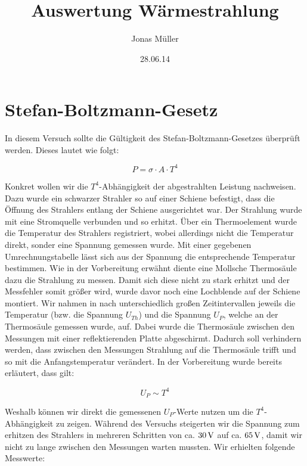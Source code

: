 \documentclass[12pt,twoside,a4paper]{article}
\title{Auswertung Wärmestrahlung}
\author{Jonas Müller}
\date{28.06.14}
\begin{document}
\section{Stefan-Boltzmann-Gesetz}

In diesem Versuch sollte die Gültigkeit des Stefan-Boltzmann-Gesetzes überprüft werden. Dieses lautet wie folgt:

\begin{equation*}
P = \sigma \cdot A \cdot T^4
\end{equation*}

Konkret wollen wir die $T^4$-Abhängigkeit der abgestrahlten Leistung nachweisen.\\
Dazu wurde ein schwarzer Strahler so auf einer Schiene befestigt, dass die Öffnung des Strahlers entlang der Schiene ausgerichtet war. Der Strahlung wurde mit eine Stromquelle verbunden und so erhitzt. Über ein Thermoelement wurde die Temperatur des Strahlers registriert, wobei allerdings nicht die Temperatur direkt, sonder eine Spannung gemessen wurde. Mit einer gegebenen Umrechnungstabelle lässt sich aus der Spannung die entsprechende Temperatur bestimmen. Wie in der Vorbereitung erwähnt diente eine Mollsche Thermosäule dazu die Strahlung zu messen. Damit sich diese nicht zu stark erhitzt und der Messfehler somit größer wird, wurde davor noch eine Lochblende auf der Schiene montiert. Wir nahmen in nach unterschiedlich großen Zeitintervallen jeweils die Temperatur (bzw. die Spannung $U_{Th}$) und die Spannung $U_P$, welche an der Thermosäule gemessen wurde, auf. Dabei wurde die Thermosäule zwischen den Messungen mit einer reflektierenden Platte abgeschirmt. Dadurch soll verhindern werden, dass zwischen den Messungen Strahlung auf die Thermosäule trifft und so mit die Anfangstemperatur verändert. In der Vorbereitung wurde bereits erläutert, dass gilt:

\begin{equation*}
U_P \sim T^4
\end{equation*}

Weshalb können wir direkt die gemessenen $U_P$-Werte nutzen um die $T^4$-Abhängigkeit zu zeigen. Während des Versuchs steigerten wir die Spannung zum erhitzen des Strahlers in mehreren Schritten von ca. $\unit[30]{V}$ auf ca. $\unit[65]{V}$, damit wir nicht zu lange zwischen den Messungen warten mussten. Wir erhielten folgende Messwerte:
\end{document}
